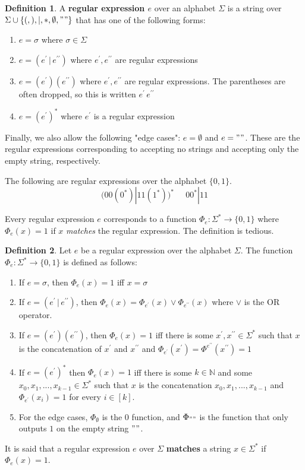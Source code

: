 \documentclass[a4paper, 12pt]{report}
\theoremstyle{remark}
\theoremstyle{definition}
\newtheorem{definition}{Definition}[section]
\begin{document}
\begin{definition}
A \textbf{regular expression $e$} over an alphabet $\Sigma$ is a string over $\Sigma \cup \{(, ), |, *, \emptyset, ""\}$ that has one of the following forms: 
\begin{enumerate}
    \item $e = \sigma$ where $\sigma \in \Sigma$ 
    \item $e = (e^\prime \,|\, e^{\prime\prime})$ where $e^\prime, e^{\prime\prime}$ are regular expressions
    \item $e = (e^\prime)(e^{\prime\prime})$ where $e^\prime, e^{\prime\prime}$ are regular expressions. The parentheses are often dropped, so this is written $e^\prime \, e^{\prime\prime}$
    \item $e = (e^\prime)^*$ where $e^\prime$ is a regular expression
\end{enumerate}
Finally, we also allow the following "edge cases": $e = \emptyset$ and $e = ""$. These are the regular expressions corresponding to accepting no strings and accepting only the empty string, respectively. 
\end{definition}

\begin{example}
The following are regular expressions over the alphabet $\{0,1\}$. 
\[\big( 00(0^*)|11(1^*)\big)^* \;\;\;\;\; 00^*|11\]
\end{example}

Every regular expression $e$ corresponds to a function $\Phi_e : \Sigma^* \longrightarrow \{0,1\}$ where $\Phi_e (x) = 1$ if $x$ \textit{matches} the regular expression. The definition is tedious. 

\begin{definition}
Let $e$ be a regular expression over the alphabet $\Sigma$. The function $\Phi_e : \Sigma^* \longrightarrow \{0,1\}$ is defined as follows: 
\begin{enumerate}
    \item If $e = \sigma$, then $\Phi_e (x) = 1$ iff $x = \sigma$ 
    \item If $e = (e^\prime \,|\, e^{\prime\prime})$, then $\Phi_e (x) = \Phi_{e^\prime} (x) \vee \Phi_{e^{\prime\prime}} (x)$ where $\vee$ is the OR operator. 
    \item If $e = (e^\prime) (e^{\prime\prime})$, then $\Phi_e (x) = 1$ iff there is some $x^\prime, x^{\prime\prime} \in \Sigma^*$ such that $x$ is the concatenation of $x^\prime$ and $x^{\prime\prime}$ and $\Phi_{e^\prime} (x^\prime) = \Phi^{e^{\prime\prime}} (x^{\prime\prime}) = 1$ 
    \item If $e = (e^\prime)^*$ then $\Phi_e (x) = 1$ iff there is some $k \in \mathbb{N}$ and some $x_0, x_1, ..., x_{k-1} \in \Sigma^*$ such that $x$ is the concatenation $x_0, x_1, ..., x_{k-1}$ and $\Phi_{e^\prime} (x_i) = 1$ for every $i \in [k]$. 
    \item For the edge cases, $\Phi_{\emptyset}$ is the $0$ function, and $\Phi_{""}$ is the function that only outputs $1$ on the empty string $""$. 
\end{enumerate}
It is said that a regular expression $e$ over $\Sigma$ \textbf{matches} a string $x \in \Sigma^*$ if $\Phi_e (x) = 1$. 
\end{definition}
\end{document}

